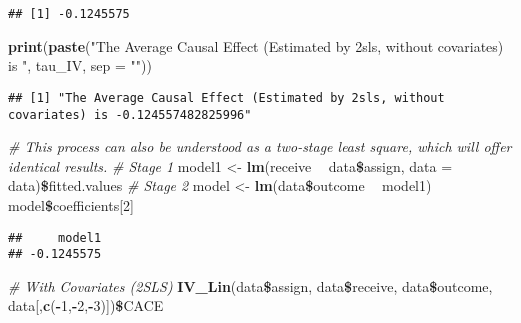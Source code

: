 \documentclass[]{article}
\newenvironment{Shaded}{\begin{snugshade}}{\end{snugshade}}
\newcommand{\KeywordTok}[1]{\textcolor[rgb]{0.13,0.29,0.53}{\textbf{#1}}}
\newcommand{\DataTypeTok}[1]{\textcolor[rgb]{0.13,0.29,0.53}{#1}}
\newcommand{\DecValTok}[1]{\textcolor[rgb]{0.00,0.00,0.81}{#1}}
\newcommand{\StringTok}[1]{\textcolor[rgb]{0.31,0.60,0.02}{#1}}
\newcommand{\CommentTok}[1]{\textcolor[rgb]{0.56,0.35,0.01}{\textit{#1}}}
\newcommand{\OperatorTok}[1]{\textcolor[rgb]{0.81,0.36,0.00}{\textbf{#1}}}
\newcommand{\NormalTok}[1]{#1}
\begin{document}
\begin{verbatim}
## [1] -0.1245575
\end{verbatim}

\begin{Shaded}
\begin{Highlighting}[]
\KeywordTok{print}\NormalTok{(}\KeywordTok{paste}\NormalTok{(}\StringTok{"The Average Causal Effect (Estimated by 2sls, without covariates) is "}\NormalTok{, tau_IV, }\DataTypeTok{sep =} \StringTok{""}\NormalTok{))}
\end{Highlighting}
\end{Shaded}

\begin{verbatim}
## [1] "The Average Causal Effect (Estimated by 2sls, without covariates) is -0.124557482825996"
\end{verbatim}

\begin{Shaded}
\begin{Highlighting}[]
\CommentTok{# This process can also be understood as a two-stage least square, which will offer identical results.}
\CommentTok{# Stage 1}
\NormalTok{model1 <-}\StringTok{ }\KeywordTok{lm}\NormalTok{(receive }\OperatorTok{~}\StringTok{ }\NormalTok{data}\OperatorTok{\$}\NormalTok{assign, }\DataTypeTok{data =}\NormalTok{ data)}\OperatorTok{\$}\NormalTok{fitted.values}
\CommentTok{# Stage 2}
\NormalTok{model <-}\StringTok{ }\KeywordTok{lm}\NormalTok{(data}\OperatorTok{\$}\NormalTok{outcome }\OperatorTok{~}\StringTok{  }\NormalTok{model1)}
\NormalTok{model}\OperatorTok{\$}\NormalTok{coefficients[}\DecValTok{2}\NormalTok{]}
\end{Highlighting}
\end{Shaded}

\begin{verbatim}
##     model1 
## -0.1245575
\end{verbatim}

\begin{Shaded}
\begin{Highlighting}[]
\CommentTok{# With Covariates (2SLS)}
\KeywordTok{IV_Lin}\NormalTok{(data}\OperatorTok{\$}\NormalTok{assign, data}\OperatorTok{\$}\NormalTok{receive, data}\OperatorTok{\$}\NormalTok{outcome, data[,}\KeywordTok{c}\NormalTok{(}\OperatorTok{-}\DecValTok{1}\NormalTok{,}\OperatorTok{-}\DecValTok{2}\NormalTok{,}\OperatorTok{-}\DecValTok{3}\NormalTok{)])}\OperatorTok{\$}\NormalTok{CACE}
\end{Highlighting}
\end{Shaded}
\end{document}
